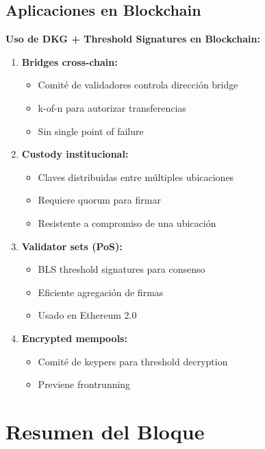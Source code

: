 \documentclass[11pt,a4paper,twoside]{book}
\theoremstyle{definition}
\theoremstyle{remark}
\begin{document}
\subsection{Aplicaciones en Blockchain}

\begin{keyidea}
\textbf{Uso de DKG + Threshold Signatures en Blockchain:}

\begin{enumerate}
    \item \textbf{Bridges cross-chain:}
    \begin{itemize}
        \item Comité de validadores controla dirección bridge
        \item k-of-n para autorizar transferencias
        \item Sin single point of failure
    \end{itemize}
    
    \item \textbf{Custody institucional:}
    \begin{itemize}
        \item Claves distribuidas entre múltiples ubicaciones
        \item Requiere quorum para firmar
        \item Resistente a compromiso de una ubicación
    \end{itemize}
    
    \item \textbf{Validator sets (PoS):}
    \begin{itemize}
        \item BLS threshold signatures para consenso
        \item Eficiente agregación de firmas
        \item Usado en Ethereum 2.0
    \end{itemize}
    
    \item \textbf{Encrypted mempools:}
    \begin{itemize}
        \item Comité de keypers para threshold decryption
        \item Previene frontrunning
    \end{itemize}
\end{enumerate}
\end{keyidea}

\section*{Resumen del Bloque}
\end{document}
